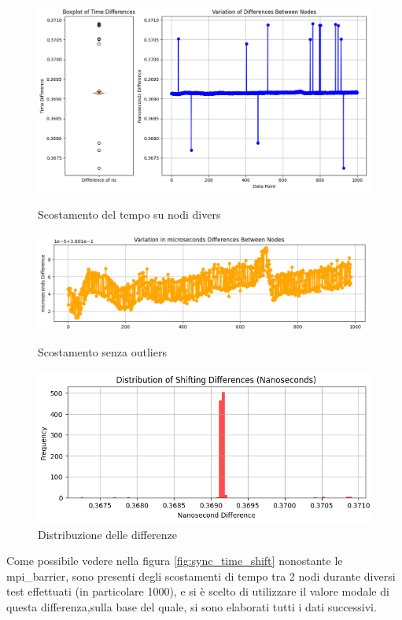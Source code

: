 \begin{figure}[H]
    \centering
    \includegraphics[width=\textwidth]{./results/time_sync_node.png}
    \caption{Scostamento del tempo su nodi divers}\label{fig:sync_time_shift}
    \includegraphics[width=0.99\textwidth]{./results/time_shift_clean.png}
    \caption{Scostamento senza outliers}\label{fig:sync_diff_distr}
    \includegraphics[width=\textwidth]{./results/time_sync_distribution.png}
    \caption{Distribuzione delle differenze}\label{fig:sync_diff_distr}
\end{figure}

Come possibile vedere nella figura \ref{fig:sync_time_shift} nonostante le mpi\_barrier, sono presenti degli scostamenti di tempo tra 2 nodi durante diversi test effettuati (in particolare 1000), e si è scelto di utilizzare il valore modale di questa differenza,sulla base del quale, si sono elaborati tutti i dati successivi.

